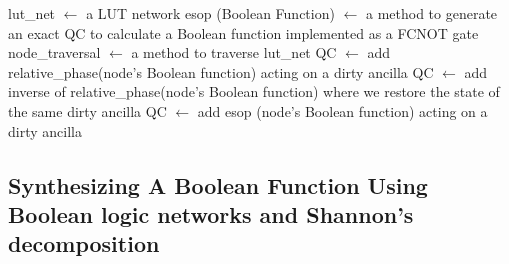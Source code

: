   

\begin{algorithm}[tb]
  \caption{lut\_synthesis}
  \label{algo-lut}
  \begin{algorithmic}
    \State lut\_net $\leftarrow$ a LUT network
    \State esop (Boolean Function) $\leftarrow$ a method to generate
    an exact QC to calculate a Boolean function implemented as a FCNOT gate 
    \State node\_traversal $\leftarrow$ a method to traverse lut\_net
    \State QC $\leftarrow$ add relative\_phase(node's Boolean function) acting on a dirty ancilla
    \State QC $\leftarrow$ add inverse of relative\_phase(node's 
    Boolean function) where we restore the state of the same dirty ancilla
    \State QC $\leftarrow$ add esop (node's Boolean function) acting on a dirty ancilla
    \EndIf
    \EndWhile
  \end{algorithmic}
\end{algorithm}

\subsection{Synthesizing A Boolean Function Using Boolean logic networks and Shannon's decomposition}

